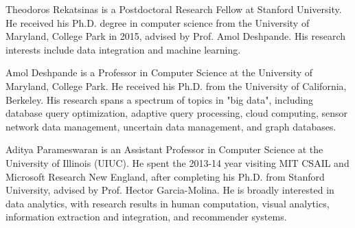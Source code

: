 \documentclass[10pt,journal,compsoc]{IEEEtran}
\begin{document}
\begin{IEEEbiography}{Theodoros Rekatsinas} is a Postdoctoral Research Fellow at Stanford University. He received his Ph.D. degree in computer science from the University of Maryland, College Park in 2015, advised by Prof. Amol Deshpande. His research interests include data integration and machine learning. 
\end{IEEEbiography}

\begin{IEEEbiography}{Amol Deshpande} is a Professor in Computer Science at the University of Maryland, College Park. He received his Ph.D. from the University of California, Berkeley. His research spans a spectrum of topics in "big data", including database query optimization, adaptive query processing, cloud computing, sensor network data management, uncertain data management, and graph databases.
\end{IEEEbiography}


\begin{IEEEbiography}{Aditya Parameswaran} is an Assistant Professor in Computer Science at the University of Illinois (UIUC). He spent the 2013-14 year visiting MIT CSAIL and Microsoft Research New England, after completing his Ph.D. from Stanford University, advised by Prof. Hector Garcia-Molina. He is broadly interested in data analytics, with research results in human computation, visual analytics, information extraction and integration, and recommender systems. \end{IEEEbiography}
\end{document}
